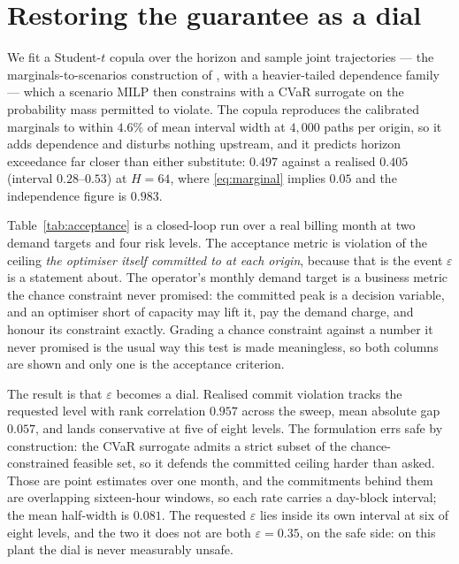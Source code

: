 \section{Restoring the guarantee as a dial}
\label{sec:dial}



We fit a Student-$t$ copula over the horizon and sample joint trajectories
--- the marginals-to-scenarios construction of \citet{pinson2009scenarios},
with a heavier-tailed dependence family --- which a scenario MILP then
constrains with a CVaR surrogate \citep{rockafellar2000cvar,nemirovski2006convex}
on the probability mass permitted to violate. The copula reproduces the calibrated marginals to
within $4.6\%$ of mean interval width at $4{,}000$ paths per origin, so it adds
dependence and disturbs nothing upstream, and it predicts horizon exceedance far
closer than either substitute: $0.497$ against a realised $0.405$ (interval
$0.28$--$0.53$) at $H=64$,
where \eqref{eq:marginal} implies $0.05$ and the independence figure is $0.983$.

Table~\ref{tab:acceptance} is a closed-loop run over a real billing month at two
demand targets and four risk levels. The acceptance metric is violation of the
ceiling \emph{the optimiser itself committed to at each origin}, because that is
the event $\varepsilon$ is a statement about. The operator's monthly demand
target is a business metric the chance constraint never promised: the committed
peak is a decision variable, and an optimiser short of capacity may lift it, pay
the demand charge, and honour its constraint exactly. Grading a chance
constraint against a number it never promised is the usual way this test is made
meaningless, so both columns are shown and only one is the acceptance criterion.

The result is that $\varepsilon$ becomes a dial. Realised commit violation
tracks the requested level with rank correlation $0.957$ across the sweep, mean
absolute gap $0.057$, and lands conservative at five of eight levels. The
formulation errs safe by construction: the CVaR surrogate admits a strict subset
of the chance-constrained feasible set, so it defends the committed ceiling
harder than asked. Those are point estimates over one month, and the
commitments behind them are overlapping sixteen-hour windows, so each rate
carries a day-block interval; the mean half-width is $0.081$. The requested
$\varepsilon$ lies inside its own interval at six of eight levels, and the two
it does not are both $\varepsilon=0.35$, on the safe side: on this plant the
dial is never measurably unsafe.

